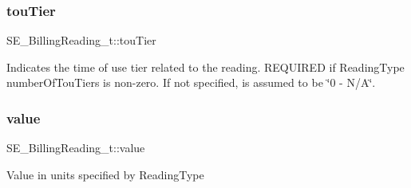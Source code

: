 \subsubsection{\texorpdfstring{tou\+Tier}{touTier}}
{\footnotesize\ttfamily S\+E\+\_\+\+Billing\+Reading\+\_\+t\+::tou\+Tier}

Indicates the time of use tier related to the reading. R\+E\+Q\+U\+I\+R\+ED if Reading\+Type number\+Of\+Tou\+Tiers is non-\/zero. If not specified, is assumed to be \char`\"{}0 -\/ N/\+A\char`\"{}. \mbox{\label{group__BillingReading_gabd07007bfa337e4ff2dddde3c86b93ce}} 
\subsubsection{\texorpdfstring{value}{value}}
{\footnotesize\ttfamily S\+E\+\_\+\+Billing\+Reading\+\_\+t\+::value}

Value in units specified by Reading\+Type 